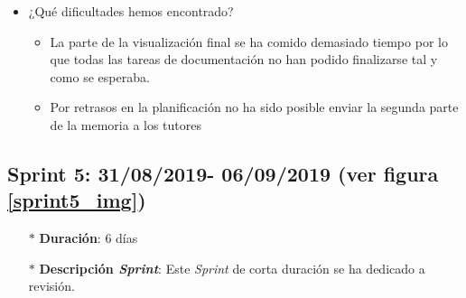 \begin{enumerate}
\begin{itemize}
\begin{itemize}
		\end{itemize}
		\item ¿Qué dificultades hemos encontrado?
		\begin{itemize}
			\item La parte de la visualización final se ha comido demasiado tiempo por lo que todas las tareas de documentación no han podido finalizarse tal y como se esperaba.
			\item Por retrasos en la planificación no ha sido posible enviar la segunda parte de la memoria a los tutores
		\end{itemize}
	\end{itemize}	
\end{enumerate}

\subsection{Sprint 5: 31/08/2019- 06/09/2019 (ver figura \ref{sprint5_img})}\label{sprint5}
\begin{itemize}
	\item[$\ast$] \textbf{Duración}:  6 días
	\item[$\ast$] \textbf{Descripción \textit{Sprint}}: Este \textit{Sprint} de corta duración se ha dedicado a revisión.
\end{itemize}
